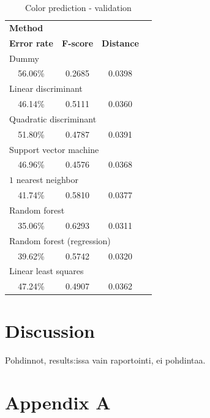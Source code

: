 \documentclass[twoside]{article}
\begin{document}
\begin{multicols}{2}
\begin{table}[H]
\caption{Color prediction - validation}
\label{table:quality_validation}
\centering
\begin{tabular}{cccc}
\multicolumn{3}{l}{\textbf{Method}} \\
\textbf{Error rate} & \textbf{F-score} & \textbf{Distance} \\
\midrule
\multicolumn{3}{l}{Dummy} \\
56.06\% & 0.2685 & 0.0398 \\
\multicolumn{3}{l}{Linear discriminant} \\
46.14\% & 0.5111 & 0.0360 \\
\multicolumn{3}{l}{Quadratic discriminant} \\
51.80\% & 0.4787 & 0.0391 \\
\multicolumn{3}{l}{Support vector machine} \\
46.96\% & 0.4576 & 0.0368 \\
\multicolumn{3}{l}{$1$ nearest neighbor} \\
41.74\% & 0.5810 & 0.0377 \\
\multicolumn{3}{l}{Random forest} \\
35.06\% & 0.6293 & 0.0311 \\
\multicolumn{3}{l}{Random forest (regression)} \\
39.62\% & 0.5742 & 0.0320 \\
\multicolumn{3}{l}{Linear least squares} \\
47.24\% & 0.4907 & 0.0362 \\
\end{tabular}
\end{table}


\section{Discussion}

Pohdinnot, results:issa vain raportointi, ei pohdintaa.



{}


\section*{Appendix A}


\end{multicols}
\end{document}
